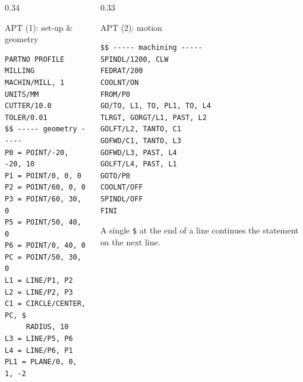 \documentclass[aspectratio=169]{beamer}
\begin{document}
	\begin{frame}{}

		\vspace*{0.05cm}

		\begin{columns}[T,onlytextwidth]

			
			\begin{column}{0.34\textwidth}
				
				\begin{block}{APT (1): set-up \& geometry}
					
\begin{lstlisting}[style=aptstyle,basicstyle=\ttfamily\scriptsize]
PARTNO PROFILE MILLING
MACHIN/MILL, 1
UNITS/MM
CUTTER/10.0
TOLER/0.01
$$ ----- geometry -----
P0 = POINT/-20, -20, 10
P1 = POINT/0, 0, 0
P2 = POINT/60, 0, 0
P3 = POINT/60, 30, 0
P5 = POINT/50, 40, 0
P6 = POINT/0, 40, 0
PC = POINT/50, 30, 0
L1 = LINE/P1, P2
L2 = LINE/P2, P3
C1 = CIRCLE/CENTER, PC, $
     RADIUS, 10
L3 = LINE/P5, P6
L4 = LINE/P6, P1
PL1 = PLANE/0, 0, 1, -2
\end{lstlisting}
					
				\end{block}
				
			\end{column}
			
			
			
			\begin{column}{0.33\textwidth}
				
				\begin{block}{APT (2): motion}
					
\begin{lstlisting}[style=aptstyle,basicstyle=\ttfamily\scriptsize]
$$ ----- machining -----
SPINDL/1200, CLW
FEDRAT/200
COOLNT/ON
FROM/P0
GO/TO, L1, TO, PL1, TO, L4
TLRGT, GORGT/L1, PAST, L2
GOLFT/L2, TANTO, C1
GOFWD/C1, TANTO, L3
GOFWD/L3, PAST, L4
GOLFT/L4, PAST, L1
GOTO/P0
COOLNT/OFF
SPINDL/OFF
FINI
\end{lstlisting}
					
				\end{block}
				
				\footnotesize A single \texttt{\$} at the end of a line continues the statement on the next line.
				

\end{column}
\end{columns}
\end{frame}
\end{document}
